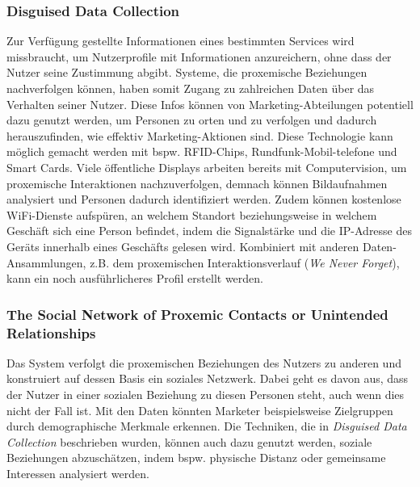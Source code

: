 \documentclass[a4paper]{article}
\begin{document}
\subsubsection{Disguised Data Collection}
\label{sssec:disguised_data_collection}
Zur Verfügung gestellte Informationen eines bestimmten Services wird missbraucht, um Nutzerprofile mit Informationen anzureichern, ohne dass der Nutzer seine Zustimmung abgibt. Systeme, die proxemische Beziehungen nachverfolgen können, haben somit Zugang zu zahlreichen Daten über das Verhalten seiner Nutzer. Diese Infos können von Marketing-Abteilungen potentiell dazu genutzt werden, um Personen zu orten und zu verfolgen und dadurch herauszufinden, wie effektiv Marketing-Aktionen sind. Diese Technologie kann möglich gemacht werden mit bspw. RFID-Chips, Rundfunk-Mobil-telefone und Smart Cards. Viele öffentliche Displays arbeiten bereits mit Computervision, um proxemische Interaktionen nachzuverfolgen, demnach können Bildaufnahmen analysiert und Personen dadurch identifiziert werden. Zudem können kostenlose WiFi-Dienste aufspüren, an welchem Standort beziehungsweise in welchem Geschäft sich eine Person befindet, indem die Signalstärke und die IP-Adresse des Geräts innerhalb eines Geschäfts gelesen wird.\newline
Kombiniert mit anderen Daten-Ansammlungen, z.B. dem proxemischen Interaktionsverlauf (\textit{We Never Forget}), kann ein noch ausführlicheres Profil erstellt werden.

\subsubsection{The Social Network of Proxemic Contacts or Unintended Relationships}
\label{sssec:the_social_network_of_proxemic_contacts}
Das System verfolgt die proxemischen Beziehungen des Nutzers zu anderen und konstruiert auf dessen Basis ein soziales Netzwerk. Dabei geht es davon aus, dass der Nutzer in einer sozialen Beziehung zu diesen Personen steht, auch wenn dies nicht der Fall ist.\newline
Mit den Daten könnten Marketer beispielsweise Zielgruppen durch demographische Merkmale erkennen. Die Techniken, die in \textit{Disguised Data Collection} beschrieben wurden, können auch dazu genutzt werden, soziale Beziehungen abzuschätzen, indem bspw. physische Distanz oder gemeinsame Interessen analysiert werden.
\end{document}
